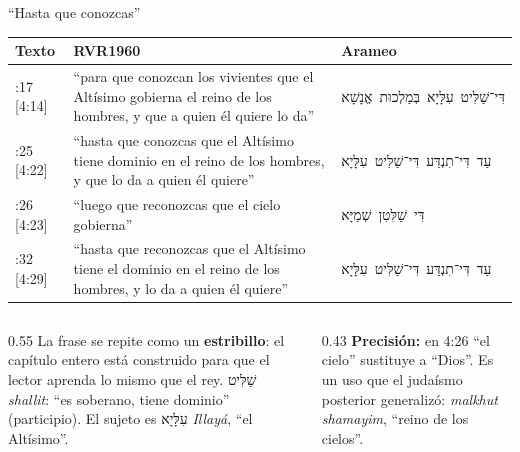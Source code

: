 \documentclass[hyperref={bookmarks=false},aspectratio=169]{beamer}
\newcommand{\heb}[1]{\mbox{\foreignlanguage{hebrew}{#1}}}
\newcommand{\destacar}[1]{\textbf{\textcolor{azul}{#1}}}
\newcommand{\precision}[1]{{\footnotesize\color{gris}\textbf{Precisión:} #1}}
\begin{document}
\begin{frame}{``Hasta que conozcas''}
\scriptsize\renewcommand{\arraystretch}{1.18}
\begin{tabular}{@{}>{\RaggedRight\arraybackslash}p{1.4cm}>{\RaggedRight\arraybackslash}p{6.1cm}>{\RaggedRight\arraybackslash}p{4.3cm}@{}}
\toprule
\textbf{Texto} & \textbf{RVR1960} & \textbf{Arameo} \\ \midrule
4:17 [4:14] & ``para que conozcan los vivientes que el Altísimo gobierna el reino de los hombres, y que a quien él quiere lo da'' & \heb{דִּי־שַׁלִּיט עִלָּיָא בְּמַלְכוּת אֱנָשָׁא} \\
4:25 [4:22] & ``hasta que conozcas que el Altísimo tiene dominio en el reino de los hombres, y que lo da a quien él quiere'' & \heb{עַד דִּי־תִנְדַּע דִּי־שַׁלִּיט עִלָּיָא} \\
4:26 [4:23] & ``luego que reconozcas que el cielo gobierna'' & \heb{דִּי שַׁלִּטִן שְׁמַיָּא} \\
4:32 [4:29] & ``hasta que reconozcas que el Altísimo tiene el dominio en el reino de los hombres, y lo da a quien él quiere'' & \heb{עַד דִּי־תִנְדַּע דִּי־שַׁלִּיט עִלָּיָא} \\
\bottomrule
\end{tabular}\par\medskip
\begin{columns}[t,onlytextwidth]
\begin{column}{0.55\textwidth}\small
La frase se repite como un \destacar{estribillo}: el capítulo entero está construido para que el lector aprenda lo mismo que el rey. \heb{שַׁלִּיט} \emph{shallit}: ``es soberano, tiene dominio'' (participio). El sujeto es \heb{עִלָּיָא} \emph{Illayá}, ``el Altísimo''.
\end{column}
\begin{column}{0.43\textwidth}
\precision{en 4:26 ``el cielo'' sustituye a ``Dios''. Es un uso que el judaísmo posterior generalizó: \emph{malkhut shamayim}, ``reino de los cielos''.}
\end{column}
\end{columns}
\end{frame}
\end{document}
